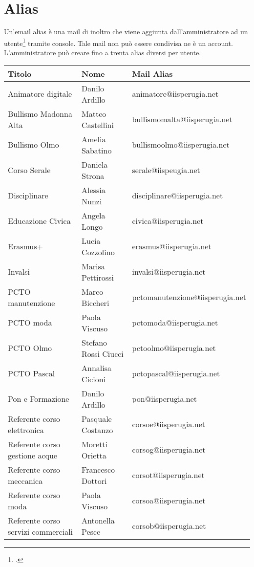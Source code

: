 \section{Alias}
Un'email alias è una mail di inoltro che viene aggiunta dall'amministratore ad un utente\footcite{Google2023d} tramite console. Tale mail non può essere condivisa ne è un account.
L'amministratore può creare fino a trenta alias diversi per utente.
\begin{center}
	
\begin{tabular}{lll}
	\toprule 
	Titolo&Nome&Mail Alias\\
	\midrule
	Animatore digitale&
	Danilo Ardillo&
	animatore@iisperugia.net\\
	Bullismo Madonna Alta&
	Matteo Castellini&
	bullismomalta@iisperugia.net\\
	Bullismo Olmo&
	Amelia Sabatino&
	bullismoolmo@iisperugia.net\\
	Corso Serale&
	Daniela Strona&
	serale@iispeugia.net\\
	Disciplinare&
	Alessia Nunzi&
	disciplinare@iisperugia.net\\
	Educazione Civica&
	Angela Longo&
	civica@iisperugia.net\\
	Erasmus+&
	Lucia Cozzolino&
	erasmus@iisperugia.net\\
	Invalsi&
	Marisa Pettirossi&
	invalsi@iisperugia.net\\
	PCTO manutenzione&
	Marco Biccheri&
	pctomanutenzione@iisperugia.net\\
	PCTO moda&
	Paola Viscuso&
	pctomoda@iisperugia.net\\
	PCTO Olmo&
	Stefano Rossi Ciucci&
	pctoolmo@iisperugia.net\\
	PCTO Pascal&
	Annalisa Cicioni&
	pctopascal@iisperugia.net\\
	Pon e Formazione&
	Danilo Ardillo&
	pon@iisperugia.net\\
	Referente corso elettronica&
	Pasquale Costanzo&
	corsoe@iisperugia.net\\
	Referente corso gestione acque&
	Moretti Orietta&
	corsog@iisperugia.net\\
	Referente corso meccanica&
	Francesco Dottori&
	corsot@iisperugia.net\\
	Referente corso moda&
	Paola Viscuso&
	corsoa@iisperugia.net\\
	Referente corso servizi commerciali&
	Antonella Pesce&
	corsob@iisperugia.net\\

\end{tabular}
\end{center}
